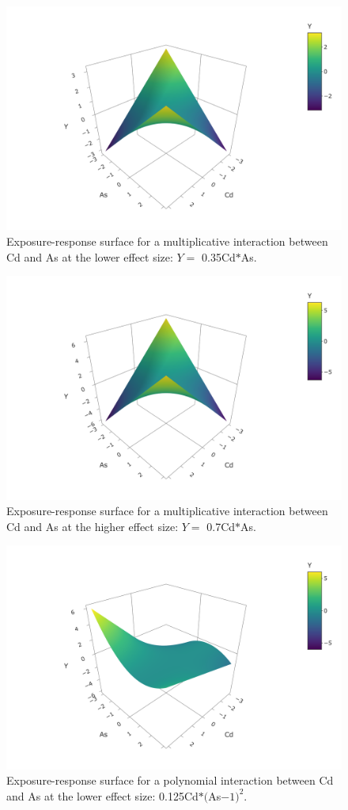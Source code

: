 \documentclass[12pt, twoside]{amherstthesis}
\begin{document}
\begin{figure}

{\centering \includegraphics[width=0.5\linewidth]{figures/surfaces/bm1} 

}

\caption{Exposure-response surface for a multiplicative interaction between Cd and As at the lower effect size: $Y=$ 0.35Cd$*$As.}\label{fig:bm1}
\end{figure}
\begin{figure}

{\centering \includegraphics[width=0.5\linewidth]{figures/surfaces/bm2} 

}

\caption{Exposure-response surface for a multiplicative interaction between Cd and As at the higher effect size: $Y=$ 0.7Cd$*$As.}\label{fig:bm2}
\end{figure}
\begin{figure}

{\centering \includegraphics[width=0.5\linewidth]{figures/surfaces/bp1} 

}

\caption{Exposure-response surface for a polynomial interaction between Cd and As at the lower effect size: 0.125Cd$*($As$-1)^2$.}\label{fig:bp1}
\end{figure}
\end{document}
